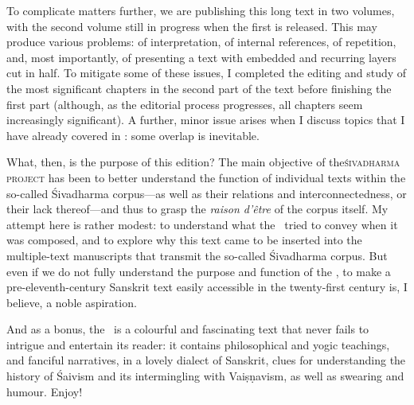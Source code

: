 To complicate matters further, we are publishing this long text
in two volumes, with the second volume still in progress
when the first is released. This may produce various problems:
of interpretation, of internal references, of repetition, 
and, most importantly, of presenting a text with
embedded and recurring layers cut in half. To mitigate
some of these issues, I completed the editing and
study of the most significant chapters in 
the second part of the text
before finishing the first part
(although, as the editorial process progresses, all chapters seem increasingly significant). 
A further, minor issue arises when I discuss topics that I have already covered in : 
some overlap is inevitable.

What, then, is the purpose of this edition? The main 
objective of the\linebreak \textsc{śiva\-dharma project} 
has been to better understand the function of 
individual texts within the so-called Śivadharma corpus---as
well as their relations and interconnectedness, or their
lack thereof---and thus to grasp 
the \emph{raison d'être} of the corpus itself. 
My attempt here is rather modest: to understand
what the \Vss\ tried to convey when it was composed, and
to explore why this text came to be inserted into the multiple-text 
manuscripts that transmit the so-called Śivadharma corpus.
But even if we do not fully understand the purpose and function of the \Vss, 
to make a pre-eleventh-century Sanskrit text easily accessible in
the twenty-first century is, I believe, a noble aspiration.

And as a bonus, the \Vss\ is a colourful and fascinating text that never fails to intrigue and entertain its reader:
it contains philosophical and yogic teachings, and fanciful narratives, in a lovely dialect of Sanskrit,
clues for understanding the history of Śaivism and its intermingling with Vaiṣṇavism,
as well as swearing and humour. Enjoy!

\vfill
\pagebreak





